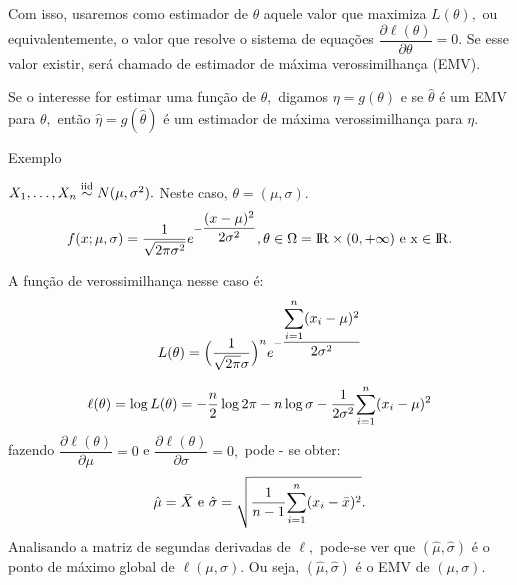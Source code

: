 \documentclass[12pt]{beamer}
\begin{document}
\begin{frame}{}
\begin{block}{}
\justifying
Com isso, usaremos como estimador de $\theta$ aquele valor que maximiza $L(\theta),$ ou equivalentemente, o valor que resolve o sistema de equações $\dfrac{\partial\ell(\theta)}{\partial \theta}=0.$ Se esse valor existir, será chamado de estimador de máxima verossimilhança (EMV).
\end{block}
\pause
\begin{block}{}
\justifying
Se o interesse for estimar uma função de $\theta,$ digamos $\eta=g(\theta)$ e se $\hat{\theta}$ é um EMV para $\theta,$ então $\hat{\eta}=g(\hat{\theta})$ é um estimador de máxima verossimilhança para $\eta.$
\end{block}
\end{frame}

\begin{frame}{Exemplo}
\begin{block}{}
\justifying
$X_{1},\ldots,X_{n}\overset{\text{iid}}{\sim} N(\mu,\sigma^{2}).$ Neste caso, $\theta=(\mu, \sigma).$
\begin{align*}
    f(x;\mu,\sigma)=\dfrac{1}{\sqrt{2\pi\sigma^{2}}}e^{-\dfrac{(x-\mu)^{2}}{2\sigma^{2}}}, \theta\in\Omega=\rm I\!R\times(0,+\infty)~\text{e}~ x\in\rm I\!R.
\end{align*}
\end{block}
\pause
\begin{block}{}
\justifying
A função de verossimilhança nesse caso é:
\begin{align*}
L(\theta)=\Big(\dfrac{1}{\sqrt{2\pi}\sigma}\Big)^{n}e^{-\dfrac{{\displaystyle \sum_{i=1}^{n}}(x_{i}-\mu)^{2}}{2\sigma^{2}}}
\end{align*}
\end{block}
\end{frame}

\begin{frame}{}
\begin{block}{}
\justifying
\begin{align*}
 \ell(\theta)=\log{L(\theta)}=-\frac{n}{2}\log{2\pi}-n\log{\sigma}-\frac{1}{2\sigma^{2}}{\displaystyle \sum_{i=1}^{n}}(x_{i}-\mu)^{2}
\end{align*}
fazendo $\dfrac{\partial\ell(\theta)}{\partial\mu}=0$ e $\dfrac{\partial\ell(\theta)}{\partial\sigma}=0,$ pode - se obter:
\begin{align*}
    \hat{\mu}=\Bar{X}~\text{e}~\hat{\sigma}=\sqrt{\dfrac{1}{n-1}{\displaystyle \sum_{i=1}^{n}}(x_{i}-\Bar{x})^{2}}.
\end{align*}
Analisando a matriz de segundas derivadas de $\ell,$ pode-se ver que $(\hat{\mu},\hat{\sigma})$ é o ponto de máximo global de $\ell(\mu,\sigma).$ Ou seja, $(\hat{\mu},\hat{\sigma})$ é o EMV de $(\mu,\sigma).$
\end{block}
\end{frame}
\end{document}
